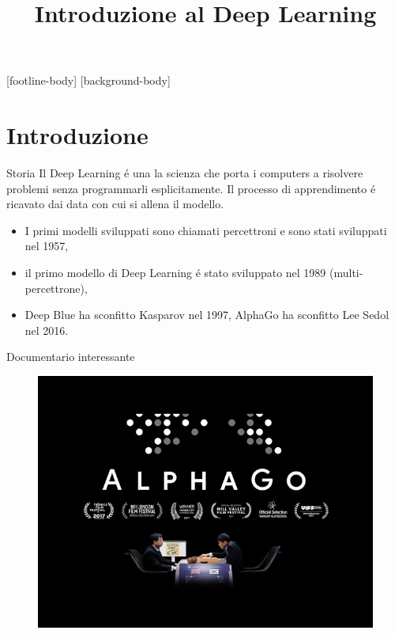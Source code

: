 \documentclass{beamer}
\title{Introduzione al Deep Learning}
\subtitle{}
\institute{{\inst{1}Dipartimento di Matematica, \newline Universit\`a di Pavia}}
\begin{document}

\frame{\titlepage}

\addtocounter{framenumber}{-1}
[footline-body]
[background-body]

\section{Introduzione}

\begin{frame}{Storia}
    Il Deep Learning \'e una la scienza che porta i computers a risolvere problemi senza programmarli esplicitamente. Il processo di apprendimento \'e ricavato dai data con cui si allena il modello.
    \pause
    \begin{itemize}
        \item  I primi modelli sviluppati sono chiamati percettroni e sono stati sviluppati nel 1957,
        \item  il primo modello di Deep Learning \'e stato sviluppato nel 1989 (multi-percettrone), 
        \item Deep Blue ha sconfitto Kasparov nel 1997, AlphaGo ha sconfitto Lee Sedol nel 2016.
    \end{itemize} 
\end{frame}

\begin{frame}{Documentario interessante}
    \begin{figure}
        \centering
        \includegraphics[height=0.9\textheight]{logos/alphaGo.jpg}
    \end{figure}
\end{frame}
\end{document}
